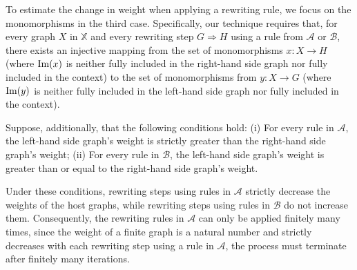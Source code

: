 To estimate the change in weight when applying a rewriting rule, we focus on 
the monomorphisms in the third case. Specifically, our technique requires that, for every graph $X$ in $\mathbb{X}$ and every rewriting step $G \Rightarrow H$ using a rule from $\mathcal{A}$ or $\mathcal{B}$, there exists an injective mapping from the set of monomorphisms $x : X \to H$ (where $\operatorname{Im}(x)$ is neither fully included in the right-hand side graph nor fully included in the context) to the set of monomorphisms from $y : X \to G$ (where $\operatorname{Im}(y)$ is neither fully included in the left-hand side graph nor fully included in the context). 

Suppose, additionally, that the following conditions hold: (i) For every rule in \( \mathcal{A} \), the left-hand side graph's weight is strictly greater than the right-hand side graph's weight; (ii) For every rule in \( \mathcal{B} \), the left-hand side graph's weight is greater than or equal to the right-hand side graph's weight. 

Under these conditions, rewriting steps using rules in \( \mathcal{A} \) strictly decrease the weights of the host graphs, while rewriting steps using rules in \( \mathcal{B} \) do not increase them.
Consequently, the rewriting rules in \( \mathcal{A} \) can only be applied finitely many times, since the weight of a finite graph is a natural number and strictly decreases with each rewriting step using a rule in \( \mathcal{A} \), the process must terminate after finitely many iterations.  


